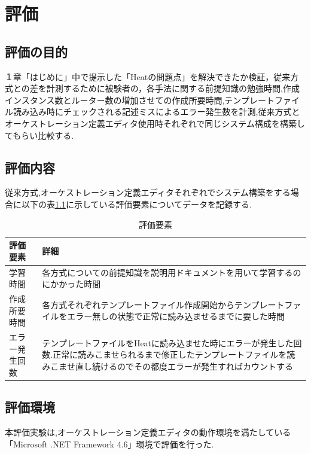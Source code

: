 \documentclass[mingoth]{kut-paper}		%
\begin{document}
\chapter{評価}
	\section{評価の目的}
	１章「はじめに」中で提示した「Heatの問題点」を解決できたか検証，従来方式との差を計測するために被験者の，各手法に関する前提知識の勉強時間,作成インスタンス数とルーター数の増加させての作成所要時間,テンプレートファイル読み込み時にチェックされる記述ミスによるエラー発生数を計測,従来方式とオーケストレーション定義エディタ使用時それぞれで同じシステム構成を構築してもらい比較する.
	\section{評価内容}
	従来方式,オーケストレーション定義エディタそれぞれでシステム構築をする場合に以下の表\ref{table:5}に示している評価要素についてデータを記録する.
	\begin{table}[H]
		\begin{center}
			\caption{評価要素}
			\label{table:5}
			\begin{tabular}{|p{5cm}|p{7cm}|}\hline
				評価要素 & 詳細\\ \hline \hline
				学習時間 & 各方式についての前提知識を説明用ドキュメントを用いて学習するのにかかった時間\\ \hline
				作成所要時間 & 各方式それぞれテンプレートファイル作成開始からテンプレートファイルをエラー無しの状態で正常に読み込ませるまでに要した時間\\ \hline
				エラー発生回数 & テンプレートファイルをHeatに読み込ませた時にエラーが発生した回数.正常に読みこませられるまで修正したテンプレートファイルを読みこませ直し続けるのでその都度エラーが発生すればカウントする\\ \hline
			\end{tabular}
		\end{center}
	\end{table}
	\section{評価環境}
	本評価実験は,オーケストレーション定義エディタの動作環境を満たしている「Microsoft .NET Framework 4.6」環境で評価を行った.
	
\end{document}
